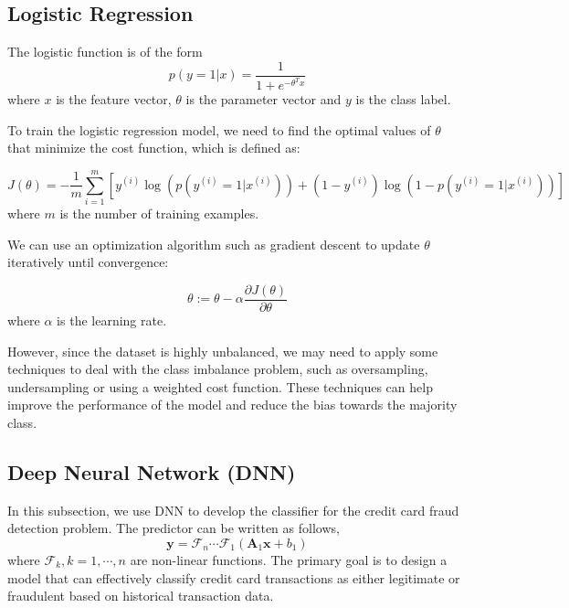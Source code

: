 \subsection{Logistic Regression}

The logistic function is of the form
\[p(y=1|x) = \frac{1}{1+e^{-\theta^Tx}}\]
where $x$ is the feature vector, $\theta$ is the parameter vector and $y$ is the class label.

To train the logistic regression model, we need to find the optimal values of $\theta$ that minimize the cost function, which is defined as:

\[J(\theta) = -\frac{1}{m}\sum_{i=1}^m[y^{(i)}\log(p(y^{(i)}=1|x^{(i)}))+(1-y^{(i)})\log(1-p(y^{(i)}=1|x^{(i)}))]\]
where $m$ is the number of training examples.

We can use an optimization algorithm such as gradient descent to update $\theta$ iteratively until convergence:

\[\theta := \theta - \alpha \frac{\partial J(\theta)}{\partial \theta}\]
where $\alpha$ is the learning rate.

However, since the dataset is highly unbalanced, we may need to apply some techniques to deal with the class imbalance problem, such as oversampling, undersampling or using a weighted cost function. These techniques can help improve the performance of the model and reduce the bias towards the majority class.


\subsection{Deep Neural Network (DNN)}
In this subsection, we use DNN to develop the classifier for the credit card fraud detection problem. The predictor can be written as follows,
\[\mathbf{y} = \mathcal{F}_n\cdots\mathcal{F}_1(\mathbf{A}_1\mathbf{x}+b_1)\]
where $\mathcal{F}_k, k=1,\cdots,n$ are non-linear functions. The primary goal is to design a model that can effectively classify credit card transactions as either legitimate or fraudulent based on historical transaction data.


